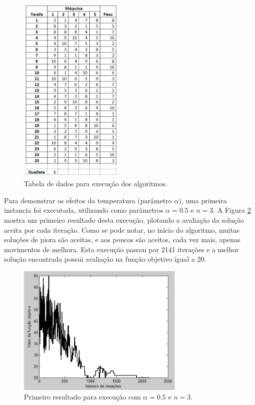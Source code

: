\documentclass[conference]{IEEEtran}
\begin{document}
	\begin{figure}[h]
		\centering
		\includegraphics[width=5cm]{img/tabela-dados.png}
		\caption{Tabela de dados para execução dos algoritmos.}
		\label{fig:tabela-dados}
	\end{figure}

Para demonstrar os efeitos da temperatura (parâmetro $\alpha$), uma primeira instancia foi executada, utilizando como parâmetros $\alpha = 0.5$ e $n = 3$. A Figura \ref{fig:result-1} mostra um primeiro resultado desta execução, plotando a avaliação da solução aceita por cada iteração. Como se pode notar, no início do algoritmo, muitas soluções de piora são aceitas, e aos poucos são aceitos, cada vez mais, apenas movimentos de melhora. Esta execução passou por 2141 iterações e a melhor solução encontrada possui avaliação na função objetivo igual a 20.

	\begin{figure}[h]
		\centering
		\includegraphics[width=8cm]{img/result-1.png}
		\caption{Primeiro resultado para execução com $\alpha = 0.5$ e $n = 3$.}
		\label{fig:result-1}
	\end{figure}
\end{document}
